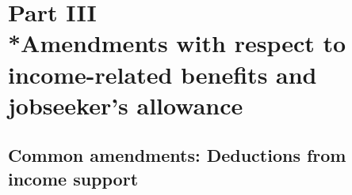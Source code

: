 \documentclass[12pt,a4paper]{article}
\begin{document}
%
%
%
%


\section[Part III --- Amendments with respect to income-related benefits and jobseeker's allowance]{Part III\\*Amendments with respect to income-related benefits and jobseeker's allowance}

\renewcommand\parthead{--- Part III}

\subsection[3. Common amendments: Deductions from income support]{Common amendments: Deductions from income support}
\end{document}

